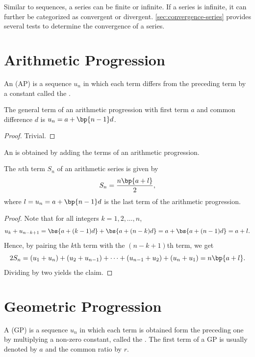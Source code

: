 Similar to sequences, a series can be finite or infinite. If a series is infinite, it can further be categorized as convergent or divergent. \SS\ref{sec:convergence-series} provides several tests to determine the convergence of a series.

\section{Arithmetic Progression}

\begin{definition}
    An  (AP) is a sequence $u_n$ in which each term differs from the preceding term by a constant called the .
\end{definition}

\begin{proposition}
    The general term of an arithmetic progression with first term $a$ and common difference $d$ is $u_n = a + \bp{n-1} d$.
\end{proposition}
\begin{proof}
    Trivial.
\end{proof}

\begin{definition}
    An  is obtained by adding the terms of an arithmetic progression.
\end{definition}

\begin{proposition}
    The $n$th term $S_n$ of an arithmetic series is given by \[S_n = \frac{n\bp{a + l}}{2},\] where $l = u_n = a + \bp{n-1} d$ is the last term of the arithmetic progression.
\end{proposition}
\begin{proof}
    Note that for all integers $k = 1, 2, \dots, n$, \[u_k + u_{n - k + 1} = \bs{a + (k-1)d} + \bs{a + (n-k)d} = a + \bs{a + (n-1)d} = a + l.\] Hence, by pairing the $k$th term with the $(n-k+1)$th term, we get \[2S_n = (u_1 + u_n) + (u_2 + u_{n-1}) + \dots + (u_{n-1} + u_2) + (u_n + u_1) = n\bp{a + l}.\] Dividing by two yields the claim.
\end{proof}

\section{Geometric Progression}

\begin{definition}
    A  (GP) is a sequence $u_n$ in which each term is obtained form the preceding one by multiplying a non-zero constant, called the . The first term of a GP is usually denoted by $a$ and the common ratio by $r$.
\end{definition}


